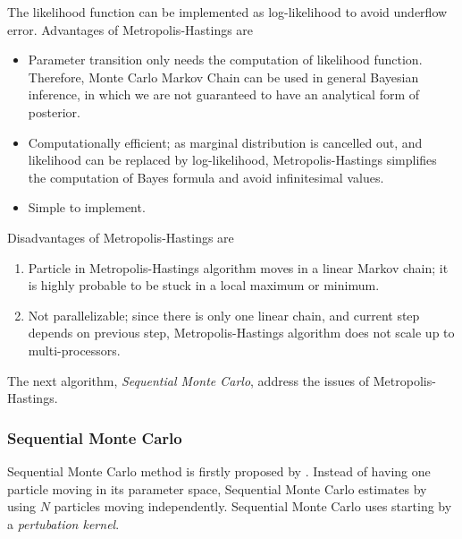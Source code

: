 The likelihood function can be implemented as log-likelihood to avoid underflow error.
Advantages of Metropolis-Hastings are
\begin{itemize}
    \item Parameter transition only needs the computation of likelihood function.
          Therefore, Monte Carlo Markov Chain can be used in general Bayesian inference,
          in which we are not guaranteed to have an analytical form of posterior.
    \item Computationally efficient; as marginal distribution is cancelled out, and likelihood can
          be replaced by log-likelihood, Metropolis-Hastings simplifies the computation of Bayes formula
          and avoid infinitesimal values.
    \item Simple to implement.
\end{itemize}
Disadvantages of Metropolis-Hastings are
\begin{enumerate}
    \item Particle in Metropolis-Hastings algorithm moves in a linear Markov chain; it is highly
          probable to be stuck in a local maximum or minimum.
    \item Not parallelizable; since there is only one linear chain, and current step depends on
          previous step, Metropolis-Hastings algorithm does not scale up to multi-processors.
\end{enumerate}
The next algorithm, \textit{Sequential Monte Carlo}, address the issues of Metropolis-Hastings.

\subsubsection{Sequential Monte Carlo}
Sequential Monte Carlo method is firstly proposed by \cite{del2006sequential}.  Instead of having
one particle moving in its parameter space, Sequential Monte Carlo estimates by using $N$ particles
moving independently. Sequential Monte Carlo uses  starting by a \textit{pertubation kernel}.

